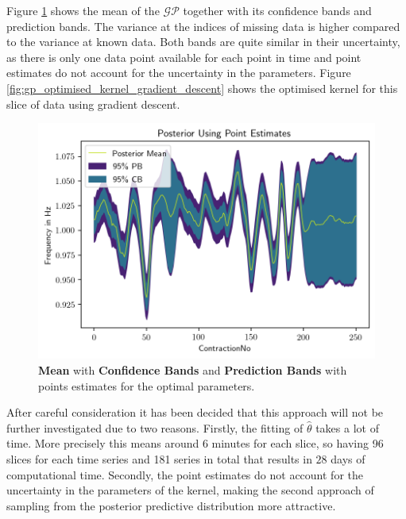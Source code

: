 \documentclass[11pt]{scrartcl}
\begin{document}
Figure \ref{fig:gp_data_example_posterior_intervals_gradient_descent} shows the mean of the $\mathcal{GP}$ together with its confidence bands and prediction bands. The variance at the indices of missing data is higher compared to the variance at known data. Both bands are quite similar in their uncertainty, as there is only one data point available for each point in time and point estimates do not account for the uncertainty in the parameters. Figure \ref{fig:gp_optimised_kernel_gradient_descent} shows the optimised kernel for this slice of data using gradient descent.

\begin{figure}[hbt]
	\center
	\includegraphics[width=1.0\textwidth]{img/gp/gp_data_example_posterior_intervals_gradient_descent.png}
	\caption{\textcolor{viridis9}{\textbf{Mean}} with \textcolor{viridis3}{\textbf{Confidence Bands}} and \textcolor{viridis0}{\textbf{Prediction Bands}} with points estimates for the optimal parameters.}
	\label{fig:gp_data_example_posterior_intervals_gradient_descent}
\end{figure}

 After careful consideration it has been decided that this approach will not be further investigated due to two reasons. Firstly, the fitting of $\hat{\theta}$ takes a lot of time. More precisely this means around 6 minutes for each slice, so having 96 slices for each time series and 181 series in total that results in $28$ days of computational time. Secondly, the point estimates do not account for the uncertainty in the parameters of the kernel, making the second approach of sampling from the posterior predictive distribution more attractive.
\end{document}
